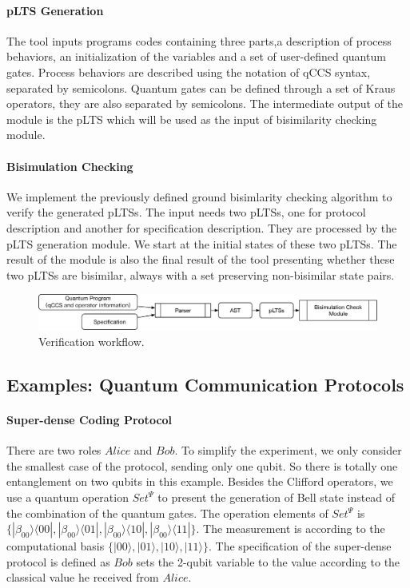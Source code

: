 \documentclass[a4paper,UKenglish,cleveref, autoref]{lipics-v2019}
\begin{document}
\paragraph*{pLTS Generation}
The tool inputs programs codes containing three parts,a description of process behaviors, an initialization of the variables and a set of user-defined quantum gates. Process behaviors are described using the notation of qCCS syntax, separated by semicolons. Quantum gates can be defined through a set of Kraus operators, they are also separated by semicolons. The intermediate output of the module is the pLTS which will be used as the input of bisimilarity checking module.
\paragraph*{Bisimulation Checking}
We implement the previously defined ground bisimlarity checking algorithm to verify the generated pLTSs. The input needs two pLTSs, one for protocol description and another for specification description. They are processed by the pLTS generation module. We start at the initial states of these two pLTSs. The result of the module is also the final result of the tool presenting whether these two pLTSs are bisimilar, always with a set preserving non-bisimilar state pairs.
\begin{figure}
\centering
\includegraphics[width=\textwidth]{images/architecture.eps}
\caption{Verification workflow.}
\label{fig:arch}
\end{figure}
\subsection{Examples: Quantum Communication Protocols}
\paragraph*{Super-dense Coding Protocol} There are two roles $Alice$ and $Bob$. To simplify the experiment, we only consider the smallest case of the protocol, sending only one qubit. So there is totally one entanglement on two qubits in this example. Besides the Clifford operators, we use a quantum operation $Set^{\Psi}$ to present the generation of Bell state instead of the combination of the quantum gates. The operation elements of $Set^{\Psi}$ is $\{|\beta_{00}\rangle\langle00|,|\beta_{00}\rangle\langle01|,|\beta_{00}\rangle\langle10|,|\beta_{00}\rangle\langle11|\}$. The measurement is according to the computational basis $\{|00\rangle,|01\rangle,|10\rangle,|11\rangle\}$. The specification of the super-dense protocol is defined as $Bob$ sets the 2-qubit variable to the value according to the classical value he received from $Alice$.
\end{document}
